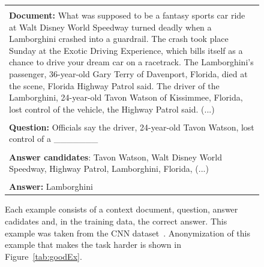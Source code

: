 \documentclass[11pt]{article}
\begin{document}
\begin{figure}[t!]
\small
\centering
\begin{tabular}{| p{}|   }
\hline
\\[-5pt]
\textbf{Document:} What was supposed to be a fantasy sports car ride at Walt Disney World Speedway turned deadly when a Lamborghini crashed into a guardrail.
The crash took place Sunday at the Exotic Driving Experience, which bills itself as a chance to drive your dream car on a racetrack.
The Lamborghini's passenger, 36-year-old Gary Terry of Davenport, Florida, died at the scene, Florida Highway Patrol said.
The driver of the Lamborghini, 24-year-old Tavon Watson of Kissimmee, Florida, lost control of the vehicle, the Highway Patrol said. (...)
\\[5pt]
\hline

\\[-5pt]
\textbf{Question:} Officials say the driver, 24-year-old Tavon Watson, lost control of a \_\_\_\_\_\_\_ 
\\[5pt]
\hline
\\[-5pt]
\textbf{Answer candidates}: Tavon Watson, Walt Disney World Speedway, Highway Patrol, Lamborghini, Florida, (...)
\\[5pt]
\hline
\\[-5pt]
\textbf{Answer:} Lamborghini
\\[5pt]
\hline
\end{tabular}
\caption{Each example consists of a context document, question, answer cadidates and, in the training data, the correct answer. This example was taken from the CNN dataset~\protect\cite{hermann2015teaching}. Anonymization of this example that makes the task harder is shown in Figure~\ref{tab:goodEx}.}

\label{tab:example_question}
\end{figure}
\end{document}
